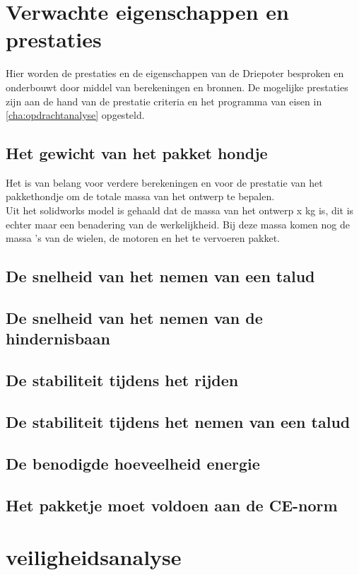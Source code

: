 \section{Verwachte eigenschappen en prestaties}
\label{se:prestatie_en_eigenschappen}
Hier worden de prestaties en de eigenschappen van de Driepoter besproken en onderbouwt door middel van berekeningen en bronnen. De mogelijke prestaties zijn aan de hand van de prestatie criteria en het programma van eisen in \cref{cha:opdrachtanalyse} opgesteld.

\subsection{Het gewicht van het pakket hondje}
Het is van belang voor verdere berekeningen en voor de prestatie van het pakkethondje om de totale massa van het ontwerp te bepalen.\\
Uit het solidworks model is gehaald dat de massa van het ontwerp x kg is, dit is echter maar een benadering van de werkelijkheid. Bij deze massa komen nog de massa 's van de wielen, de motoren en het te vervoeren pakket.\\

\subsection{De snelheid van het nemen van een talud}

\subsection{De snelheid van het nemen van de hindernisbaan}

\subsection{De stabiliteit tijdens het rijden}

\subsection{De stabiliteit tijdens het nemen van een talud}

\subsection{De benodigde hoeveelheid energie}

\subsection{Het pakketje moet voldoen aan de CE-norm}

\section{veiligheidsanalyse}
\label{se:veiligheidsanalyse_prestatieverwachting}

